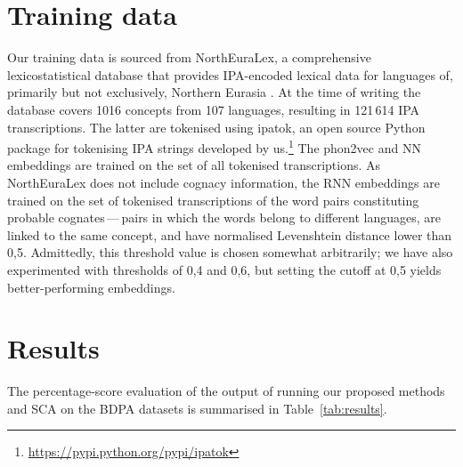 \documentclass[a4paper]{report}
\begin{document}
\section{Training data}

Our training data is sourced from NorthEuraLex, a comprehensive lexicostatistical database
that provides IPA-encoded lexical data for languages of, primarily but not exclusively, Northern Eurasia \citep{2017_Dellert_Jäger}.
At the time of writing the database covers 1016 concepts from 107 languages, resulting in 121\,614 IPA transcriptions.
The latter are tokenised using ipatok, an open source Python package for tokenising IPA strings developed by us.\footnote{\url{https://pypi.python.org/pypi/ipatok}}
The phon2vec and NN embeddings are trained on the set of all tokenised transcriptions.
As NorthEuraLex does not include cognacy information,
the RNN embeddings are trained on the set of tokenised transcriptions of the word pairs constituting probable cognates\,---\,pairs
in which the words belong to different languages, are linked to the same concept, and have normalised Levenshtein distance lower than 0,5.
Admittedly, this threshold value is chosen somewhat arbitrarily;
we have also experimented with thresholds of 0,4 and 0,6, but setting the cutoff at 0,5 yields better-performing embeddings.


\section{Results}

The percentage-score evaluation of the output of running our proposed methods and SCA on the BDPA datasets is summarised in Table~\ref{tab:results}.
\end{document}
